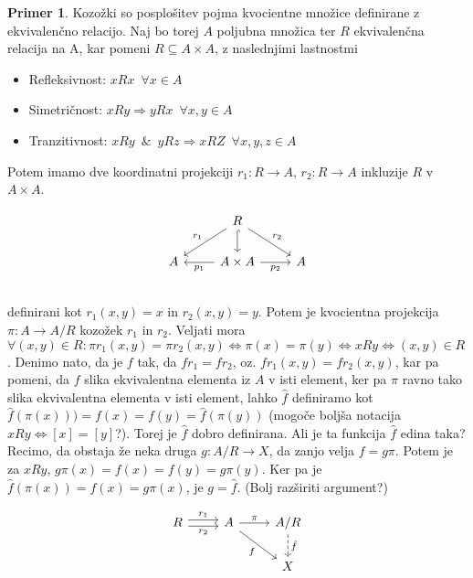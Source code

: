 \documentclass[12pt,a4paper]{book}
\theoremstyle{definition}
\theoremstyle{plain}
\theoremstyle{definition}
\newtheorem{primer}{Primer}[section]
\theoremstyle{remark}
\begin{document}
\begin{primer}
Kozožki so posplošitev pojma kvocientne množice definirane z ekvivalenčno relacijo. Naj bo torej $A$ poljubna množica ter $R$ ekvivalenčna relacija na A, kar pomeni $R \subseteq A \times A$, z naslednjimi lastnostmi
\begin{itemize}
\item Refleksivnost: $xRx \enspace \forall x \in A$
\item Simetričnost: $xRy \Rightarrow yRx \enspace \forall x,y \in A$
\item Tranzitivnost: $xRy \enspace\&\enspace yRz \Rightarrow xRZ \enspace \forall x,y,z \in A$
\end{itemize}
Potem imamo dve koordinatni projekciji $r_1 : R \to A$, $r_2 : R \to A$ inkluzije $R$ v $A \times A$.

$$\begin{tikzcd}
& R \ar[dl, "r_1"'] \ar[d, hook] \ar[dr, "r_2"] & \\
A & A \times A \ar[l, "p_1"] \ar[r, "p_2"'] & A \\
\end{tikzcd}$$
definirani kot $r_1(x,y) = x$ in $r_2(x,y) = y$. Potem je kvocientna projekcija $\pi : A \to A/R$ kozožek $r_1$ in $r_2$.
Veljati mora $\forall (x,y) \in R : \pi r_1(x,y) = \pi r_2(x,y) \Leftrightarrow \pi(x) = \pi(y) \Leftrightarrow xRy \Leftrightarrow (x,y) \in R$. Denimo nato, da je $f$ tak, da $fr_1 = fr_2$, oz. $fr_1(x,y) = fr_2(x,y) $, kar pa pomeni, da $f$ slika ekvivalentna elementa iz $A$ v isti element, ker pa $\pi$  ravno tako slika ekvivalentna elementa v isti element, lahko $\hat{f}$ definiramo kot $\hat{f}(\pi(x)) ) = f(x) = f(y) = \hat{f}(\pi(y))$ (mogoče boljša notacija $xRy \Leftrightarrow [x] = [y]$?). Torej je $\hat{f}$ dobro definirana. Ali je ta funkcija $\hat{f}$ edina taka? Recimo, da obstaja že neka druga $g : A/R \to X$, da zanjo velja $f = g\pi$. Potem je za $xRy$, $g\pi(x) = f(x) = f(y) = g\pi(y)$. Ker pa je $\hat{f}(\pi(x)) = f(x) = g\pi(x)$, je $g = \hat{f}$. (Bolj razširiti argument?)

$$\begin{tikzcd}
R \ar[r, shift left, "r_1"] \ar[r, shift right, "r_2"'] & A \ar[r, "\pi"] \ar[dr, "f"'] & A/R \ar[d, dashed, "\hat{f}"] \\
& & X \\
\end{tikzcd}$$



\end{primer}
\end{document}

